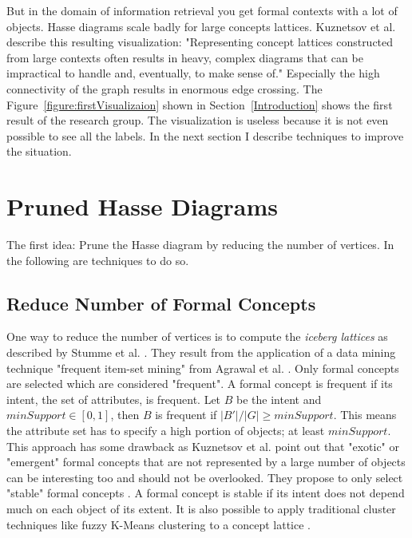 \documentclass[11pt]{report}
\begin{document}
But in the domain of information retrieval you get formal contexts with a lot of objects. Hasse diagrams scale badly for large concepts lattices. Kuznetsov et al. \cite{Kuznetsov20072}  describe this resulting visualization: "Representing concept lattices constructed from large contexts often results in heavy, complex diagrams that can be impractical to handle and, eventually, to make sense of." Especially the high connectivity of the graph results in enormous edge crossing. The Figure~\ref{figure:firstVisualizaion} shown in Section~\ref{Introduction} shows the first result of the research group. The visualization is useless because it is not even possible to see all the labels. In the next section I describe techniques to improve the situation.

\section{Pruned Hasse Diagrams}

The first idea: Prune the Hasse diagram by reducing the number of vertices. In the following are techniques to do so.

\subsection{Reduce Number of Formal Concepts}

One way to reduce the number of vertices is to compute the \textit{iceberg lattices} as described by Stumme et al. \cite{Stumme2002}. They result from the application of a data mining technique "frequent item-set mining" from Agrawal et al. \cite{Agrawal1993}. Only formal concepts are selected which are considered "frequent". A formal concept is frequent if its intent, the set of attributes, is frequent. Let $B$ be the intent and $minSupport \in [0, 1]$, then $B$ is frequent if $ |B'|/|G| \geq minSupport$. This means the attribute set has to specify a high portion of objects; at least $minSupport$. This approach has some drawback as Kuznetsov et al. \cite{Kuznetsov20072} point out that "exotic" or "emergent" formal concepts that are not represented by a large number of objects can be interesting too and should not be overlooked. They propose to only select "stable" formal concepts \cite{Kuznetsov20072}. A formal concept is stable if its intent does not depend much on each object of its extent. It is also possible to apply traditional cluster techniques like fuzzy K-Means clustering to a concept lattice \cite{AswaniKumar2010}. \\
\end{document}
